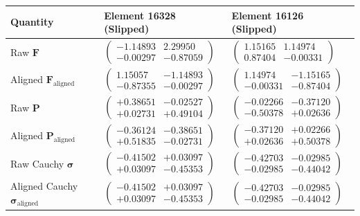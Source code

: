 \documentclass[11pt,a4paper]{article}
\begin{document}
\begin{center}
\renewcommand{\arraystretch}{1.35}
\small
\begin{tabular}{@{}lll@{}}
\toprule
\textbf{Quantity} & \textbf{Element 16328 (Slipped)} & \textbf{Element 16126 (Slipped)} \\
\midrule
Raw $\mathbf{F}$ &
$\begin{pmatrix} -1.14893 & 2.29950 \\ -0.00297 & -0.87059 \end{pmatrix}$ &
$\begin{pmatrix} 1.15165 & 1.14974 \\ 0.87404 & -0.00331 \end{pmatrix}$ \\[10pt]
Aligned $\mathbf{F}_{\text{aligned}}$ &
$\begin{pmatrix} 1.15057 & -1.14893 \\ -0.87355 & -0.00297 \end{pmatrix}$ &
$\begin{pmatrix} 1.14974 & -1.15165 \\ -0.00331 & -0.87404 \end{pmatrix}$ \\[10pt]
Raw $\mathbf{P}$ &
$\begin{pmatrix} +0.38651 & -0.02527 \\ +0.02731 & +0.49104 \end{pmatrix}$ &
$\begin{pmatrix} -0.02266 & -0.37120 \\ -0.50378 & +0.02636 \end{pmatrix}$ \\[10pt]
Aligned $\mathbf{P}_{\text{aligned}}$ &
$\begin{pmatrix} -0.36124 & -0.38651 \\ +0.51835 & -0.02731 \end{pmatrix}$ &
$\begin{pmatrix} -0.37120 & +0.02266 \\ +0.02636 & +0.50378 \end{pmatrix}$ \\[10pt]
Raw Cauchy $\boldsymbol{\sigma}$ &
$\begin{pmatrix} -0.41502 & +0.03097 \\ +0.03097 & -0.45353 \end{pmatrix}$ &
$\begin{pmatrix} -0.42703 & -0.02985 \\ -0.02985 & -0.44042 \end{pmatrix}$ \\[10pt]
Aligned Cauchy $\boldsymbol{\sigma}_{\text{aligned}}$ &
$\begin{pmatrix} -0.41502 & +0.03097 \\ +0.03097 & -0.45353 \end{pmatrix}$ &
$\begin{pmatrix} -0.42703 & -0.02985 \\ -0.02985 & -0.44042 \end{pmatrix}$ \\
\bottomrule
\end{tabular}
\end{center}
\end{document}
